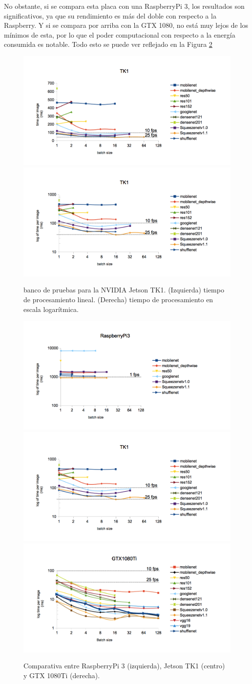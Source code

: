 No obstante, si se compara esta placa con una RaspberryPi 3, los resultados son significativos, ya que su rendimiento es más del doble con respecto a la Raspberry. Y si se compara por arriba con la GTX 1080, no está muy lejos de los mínimos de esta, por lo que el poder computacional con respecto a la energía consumida es notable. Todo esto se puede ver reflejado en la Figura \ref{fig:ben_tk1_comp}

\begin{figure}[htp]
    \centering
    \captionsetup{justification=centering}
    \includegraphics[width=.5\textwidth]{img/TK1_linear.png}\hfill
    \includegraphics[width=.5\textwidth]{img/TK1_log.png}
    \caption{banco de pruebas para la NVIDIA Jetson TK1. (Izquierda) tiempo de procesamiento lineal. (Derecha) tiempo de procesamiento en escala logarítmica.}
    \label{fig:ben_tk1}
\end{figure}

\begin{figure}[htp]
    \centering
    \captionsetup{justification=centering}
    \includegraphics[width=.33\textwidth]{img/Raspi_log.png}\hfill
    \includegraphics[width=.33\textwidth]{img/TK1_log.png}\hfill
    \includegraphics[width=.33\textwidth]{img/gtx1080_log.png}
    \caption{Comparativa entre RaspberryPi 3 (izquierda), Jetson TK1 (centro) y GTX 1080Ti (derecha).}
    \label{fig:ben_tk1_comp}
\end{figure}

